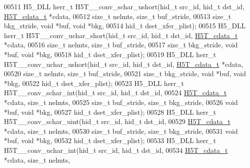 \begin{DoxyCode}
00511 H5\_DLL herr\_t H5T\_\_conv\_schar\_ushort(hid\_t src\_id, hid\_t dst\_id, \hyperlink{struct_h5_t__cdata__t}{H5T\_cdata\_t} *cdata,
00512                             \textcolor{keywordtype}{size\_t} nelmts, \textcolor{keywordtype}{size\_t} buf\_stride,
00513                             \textcolor{keywordtype}{size\_t} bkg\_stride, \textcolor{keywordtype}{void} *buf, \textcolor{keywordtype}{void} *bkg,
00514                             hid\_t dset\_xfer\_plist);
00515 H5\_DLL herr\_t H5T\_\_conv\_uchar\_short(hid\_t src\_id, hid\_t dst\_id, \hyperlink{struct_h5_t__cdata__t}{H5T\_cdata\_t} *cdata,
00516                             \textcolor{keywordtype}{size\_t} nelmts, \textcolor{keywordtype}{size\_t} buf\_stride,
00517                             \textcolor{keywordtype}{size\_t} bkg\_stride, \textcolor{keywordtype}{void} *buf, \textcolor{keywordtype}{void} *bkg,
00518                             hid\_t dset\_xfer\_plist);
00519 H5\_DLL herr\_t H5T\_\_conv\_uchar\_ushort(hid\_t src\_id, hid\_t dst\_id, \hyperlink{struct_h5_t__cdata__t}{H5T\_cdata\_t} *cdata,
00520                             \textcolor{keywordtype}{size\_t} nelmts, \textcolor{keywordtype}{size\_t} buf\_stride,
00521                             \textcolor{keywordtype}{size\_t} bkg\_stride, \textcolor{keywordtype}{void} *buf, \textcolor{keywordtype}{void} *bkg,
00522                             hid\_t dset\_xfer\_plist);
00523 H5\_DLL herr\_t H5T\_\_conv\_schar\_int(hid\_t src\_id, hid\_t dst\_id,
00524                   \hyperlink{struct_h5_t__cdata__t}{H5T\_cdata\_t} *cdata, \textcolor{keywordtype}{size\_t} nelmts,
00525                   \textcolor{keywordtype}{size\_t} buf\_stride, \textcolor{keywordtype}{size\_t} bkg\_stride,
00526                                   \textcolor{keywordtype}{void} *buf, \textcolor{keywordtype}{void} *bkg,
00527                                   hid\_t dset\_xfer\_plist);
00528 H5\_DLL herr\_t H5T\_\_conv\_schar\_uint(hid\_t src\_id, hid\_t dst\_id,
00529                    \hyperlink{struct_h5_t__cdata__t}{H5T\_cdata\_t} *cdata, \textcolor{keywordtype}{size\_t} nelmts,
00530                    \textcolor{keywordtype}{size\_t} buf\_stride, \textcolor{keywordtype}{size\_t} bkg\_stride,
00531                                    \textcolor{keywordtype}{void} *buf, \textcolor{keywordtype}{void} *bkg,
00532                                    hid\_t dset\_xfer\_plist);
00533 H5\_DLL herr\_t H5T\_\_conv\_uchar\_int(hid\_t src\_id, hid\_t dst\_id,
00534                   \hyperlink{struct_h5_t__cdata__t}{H5T\_cdata\_t} *cdata, \textcolor{keywordtype}{size\_t} nelmts,

\end{DoxyCode}
